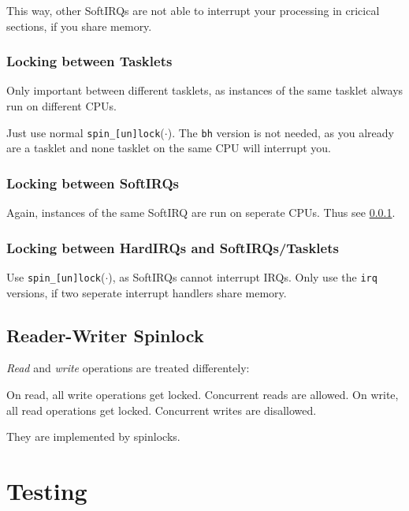 \documentclass[english]{panikzettel}
\newcommand{\fkt}[1]{\texttt{#1}(\(\cdot\))}
\begin{document}
	This way, other SoftIRQs are not able to interrupt your processing in cricical sections, if you share memory.
	
	\subsubsection{Locking between Tasklets}
	\label{sss:sleeping-and-locking:locking-between-tasklets}
	
	Only important between different tasklets, as instances of the same tasklet always run on different CPUs.

	Just use normal \fkt{spin\_[un]lock}. The \texttt{bh} version is not needed, as you already are a tasklet and none tasklet on the same CPU will interrupt you. 

	\subsubsection{Locking between SoftIRQs}
	\label{sss:sleeping-and-locking:locking-between-softirqs}
	
	Again, instances of the same SoftIRQ are run on seperate CPUs. Thus see \cref{sss:sleeping-and-locking:locking-between-tasklets}. 

	\subsubsection{Locking between HardIRQs and SoftIRQs/Tasklets}
	\label{sss:reader:locking-between-hardirqs-and-softirqs/tasklets}
	
	Use \fkt{spin\_[un]lock}, as SoftIRQs cannot interrupt IRQs.
	Only use the \texttt{irq} versions, if two seperate interrupt handlers share memory.

	\subsection{Reader-Writer Spinlock}
	\label{ss:kernel-networking:reader-writer-spinlock}
	
	\textit{Read} and \textit{write} operations are treated differentely:
	
	On read, all write operations get locked. Concurrent reads are allowed.
	On write, all read operations get locked. Concurrent writes are disallowed.

	They are implemented by spinlocks.
	
	\newpage
	\section{Testing}
	\label{s:testing}
\end{document}
